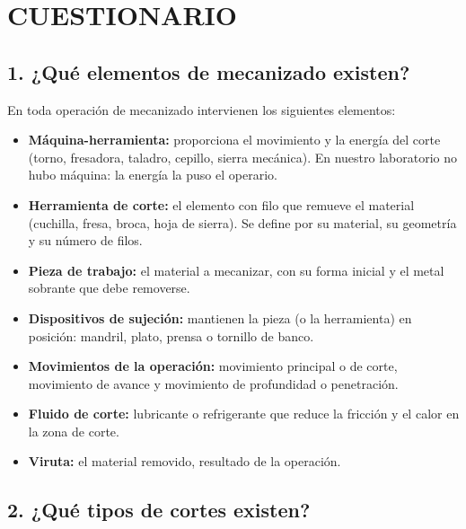 \documentclass[12pt,a4paper]{article}
\begin{document}
\section{CUESTIONARIO}

\subsection*{1. ¿Qué elementos de mecanizado existen?}

En toda operación de mecanizado intervienen los siguientes elementos:

\begin{itemize}
	\item \textbf{Máquina-herramienta:} proporciona el movimiento y la energía del
	      corte (torno, fresadora, taladro, cepillo, sierra mecánica). En nuestro
	      laboratorio no hubo máquina: la energía la puso el operario.\\[-10pt]
	\item \textbf{Herramienta de corte:} el elemento con filo que remueve el
	      material (cuchilla, fresa, broca, hoja de sierra). Se define por su
	      material, su geometría y su número de filos.\\[-10pt]
	\item \textbf{Pieza de trabajo:} el material a mecanizar, con su forma inicial
	      y el metal sobrante que debe removerse.\\[-10pt]
	\item \textbf{Dispositivos de sujeción:} mantienen la pieza (o la herramienta)
	      en posición: mandril, plato, prensa o tornillo de banco.\\[-10pt]
	\item \textbf{Movimientos de la operación:} movimiento principal o de corte,
	      movimiento de avance y movimiento de profundidad o penetración.\\[-10pt]
	\item \textbf{Fluido de corte:} lubricante o refrigerante que reduce la
	      fricción y el calor en la zona de corte.\\[-10pt]
	\item \textbf{Viruta:} el material removido, resultado de la operación.
\end{itemize}

\subsection*{2. ¿Qué tipos de cortes existen?}
\end{document}
